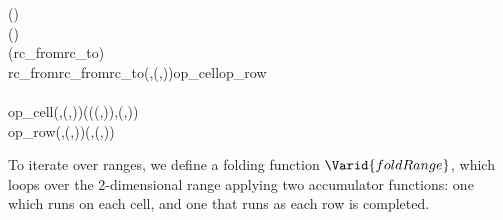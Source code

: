 \begin{hscode}\SaveRestoreHook
{}%
%
%
%
%
%
\>[B]{}\;\;(\;\;)\mathrel{=}{}\<[E]%
\\
\>[B]{}\<[4]%
\>[4]{}\;\;(\;)\;\<[E]%
\\[\blanklineskip]%
\>[B]{}\;\;(\;rc_{from}\;rc_{to}\;)\mathrel{=}{}\<[E]%
\\
\>[B]{}\<[4]%
\>[4]{}\mathbin{\$}\;rc_{from}\;rc_{from}\;rc_{to}\;(,(,))\;\;op_{cell}\;op_{row}{}\<[E]%
\\
\>[4]{}\<[7]%
\>[7]{}\<[E]%
\\
\>[7]{}\<[10]%
\>[10]{}op_{cell}\;(,(,))\;\<[37]%
\>[37]{}\mathrel{=}(\;\;(\;\;(,))\;,(\mathbin{+},)){}\<[E]%
\\
\>[7]{}\<[10]%
\>[10]{}op_{row}\;\anonymous \;\;(,(,)){}\<[37]%
\>[37]{}\mathrel{=}(,(,\mathbin{+})){}\<[E]%
\ColumnHook
\end{hscode}\resethooks

To iterate over ranges, we define a folding function \ensuremath{\Varid{foldRange}}, which
loops over the 2-dimensional range applying two accumulator functions: one
which runs on each cell, and one that runs as each row is completed.

